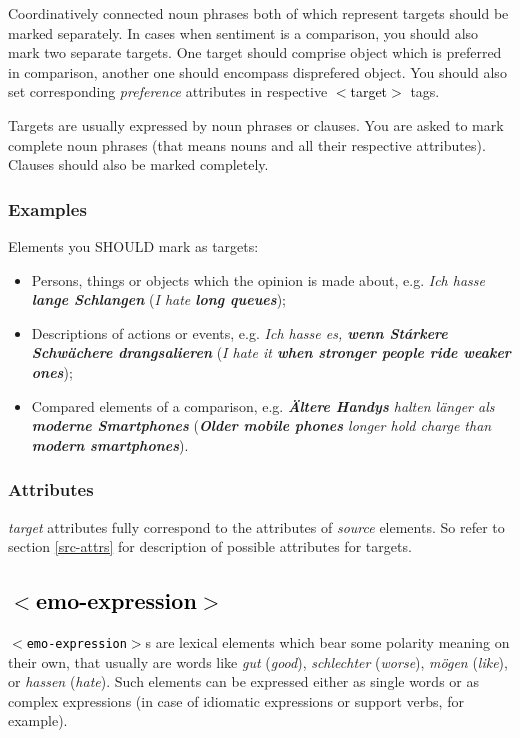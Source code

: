 \documentclass[11pt,a4paper]{article}
\newcommand{\xmltag}[1]{\textcolor{black}{{\small$<$#1$>$}}}
\begin{document}
Coordinatively connected noun phrases both of which represent targets
should be marked separately. In cases when sentiment is a comparison,
you should also mark two separate targets. One target should comprise
object which is preferred in comparison, another one should encompass
disprefered object. You should also set corresponding
\textit{preference} attributes in respective \xmltag{target} tags.

Targets are usually expressed by noun phrases or clauses. You are
asked to mark complete noun phrases (that means nouns and all their
respective attributes). Clauses should also be marked completely.

\subsubsection{Examples}
Elements you SHOULD mark as targets:
\begin{itemize}
  \item Persons, things or objects which the opinion is made about,
    e.g. \textit{Ich hasse \textbf{lange Schlangen}} (\textit{I hate
      \textbf{long queues}});

  \item Descriptions of actions or events, e.g. \textit{Ich hasse es,
    \textbf{wenn St\'arkere Schw\"achere drangsalieren}} (\textit{I
    hate it \textbf{when stronger people ride weaker ones}});

  \item Compared elements of a comparison,
    e.g. \textit{\textbf{\"Altere Handys} halten l\"anger als
      \textbf{moderne Smartphones}} (\textit{\textbf{Older mobile
        phones} longer hold charge than \textbf{modern smartphones}}).
\end{itemize}

\subsubsection{Attributes}
\textit{target} attributes fully correspond to the attributes of
\textit{source} elements. So refer to section \ref{src-attrs} for
description of possible attributes for targets.

\subsection{\xmltag{emo-expression}}
\texttt{\xmltag{emo-expression}}s are lexical elements which bear some
polarity meaning on their own, that usually are words like
\textit{gut} (\textit{good}), \textit{schlechter} (\textit{worse}),
\textit{m\"ogen} (\textit{like}), or \textit{hassen}
(\textit{hate}). Such elements can be expressed either as single words
or as complex expressions (in case of idiomatic expressions or support
verbs, for example).
\end{document}
